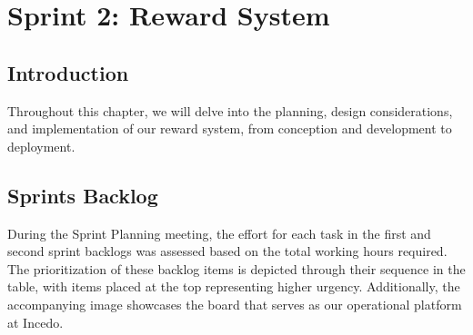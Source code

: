 \chapter{Sprint 2: Reward System}
\minitoc
\newpage

\setcounter{secnumdepth}{0} %
\section{Introduction}
Throughout this chapter, we will delve into the planning, design considerations, and implementation of our reward system, from conception and development to deployment.
\section{Sprints Backlog}
During the Sprint Planning meeting, the effort for each task in the first and second sprint backlogs was assessed based on the total working hours required. The prioritization of these backlog items is depicted through their sequence in the table, with items placed at the top representing higher urgency. Additionally, the accompanying image showcases the board that serves as our operational platform at Incedo.

%     

